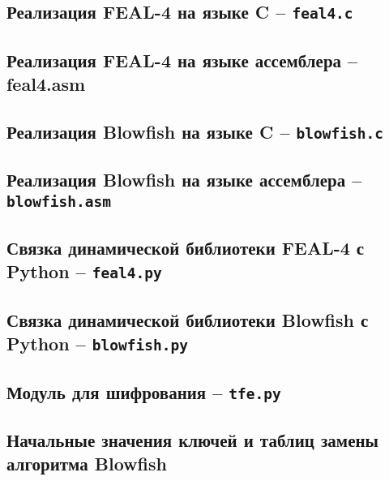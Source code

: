 \newpage
{}

\subsection*{Реализация FEAL-4 на языке C -- \texttt{feal4.c}}
\vspace{5mm}

\newpage
\subsection*{Реализация FEAL-4 на языке ассемблера -- feal4.asm}
\vspace{5mm}

\newpage
\subsection*{Реализация Blowfish на языке C -- \texttt{blowfish.c}}
\vspace{5mm}

\newpage
\subsection*{Реализация Blowfish на языке ассемблера -- \texttt{blowfish.asm}}
\vspace{5mm}

\newpage
\newpage
{}

\subsection*{Связка динамической библиотеки FEAL-4 с Python -- \texttt{feal4.py}}
\vspace{5mm}

\newpage
\subsection*{Связка динамической библиотеки Blowfish с Python -- \texttt{blowfish.py}}
\vspace{5mm}

\newpage
\subsection*{Модуль для шифрования -- \texttt{tfe.py}}
\vspace{5mm}


\newpage
{}
\subsection*{Начальные значения ключей и таблиц замены алгоритма Blowfish}
\vspace{5mm}
